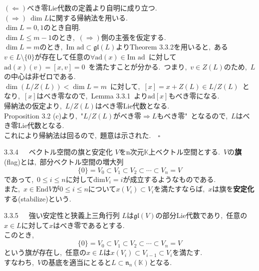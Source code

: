 \documentclass[uplatex,dvipdfmx]{jsarticle}
\begin{document}
\begin{myproof}
$(\Leftarrow)$べき零Lie代数の定義より自明に成り立つ.\\
$(\Rightarrow)~\dim L$に関する帰納法を用いる.\\
$\dim L =0,1$のとき自明.\\
$\dim L \leq m-1$のとき,~$(\Rightarrow)$側の主張を仮定する.\\
$\dim L = m$のとき,~$\text{Im ad}\subset \mathfrak{gl}(L)$よりTheorem 3.3.2を用いると,~ある$v\in L\setminus\{0\}$が存在して任意の$\forall \text{ad}(x)\in \text{Im~ad}$~に対して$\text{ad}(x)(v)=[x,v]=0$~を満たすことが分かる.~つまり,~$v\in Z(L)$のため,~$L$の中心は非ゼロである.\\
$\dim(L/Z(L)) < \dim L = m$~に対して,~$[x]=x+Z(L)\in L/Z(L)$~となり,~$[x]$はべき零なので,~Lemma 3.3.1~より$\text{ad}[x]$もべき零になる.\\
帰納法の仮定より,~$L/Z(L)$はべき零Lie代数となる.~\\
Proposition 3.2 (c)より,~"$L/Z(L)$がべき零$\Rightarrow L$もべき零"~となるので,~$L$はべき零Lie代数となる.\\
これにより帰納法は回るので,~題意は示された.~~$\square$
\end{myproof}
\newpage
\begin{mydef}{3.3.4~~~ベクトル空間の旗と安定化}
    $V$をn次元$\mathbb{K}$上ベクトル空間とする.~$V$の\textbf{旗}(flag)とは,~部分ベクトル空間の増大列
    \begin{equation*}
        \{0\}=V_0 \subset V_1 \subset V_2 \subset \cdots \subset V_n=V
    \end{equation*}
    であって,~$0\leq i \leq n$に対して$\text{dim}V_i =i$が成立するようなものである.\\
    また,~$x\in \text{End}V$が$0\leq i \leq n$について$x(V_i)\subset V_i$を満たすならば,~$x$は旗を\textbf{安定化}する(stabilize)という.
\end{mydef}
\begin{myprop}{3.3.5~~~強い安定性と狭義上三角行列}
    $L$は$\mathfrak{gl}(V)$の部分Lie代数であり,~任意の$x\in L$に対して$x$はべき零であるとする.\\
    このとき,
    \begin{equation*}
        \{0\}=V_0 \subset V_1 \subset V_2 \subset \cdots \subset V_n=V
    \end{equation*}
    という旗が存在し,~任意の$x\in L$は$x(V_i)\subset V_{i-1}\subset V_i$を満たす.\\
    すなわち,~$V$の基底を適当にとると$L\subset \mathfrak{n}_n(\mathbb{K})$となる.
\end{myprop}
\end{document}
